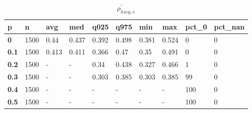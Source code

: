 \begin{table}[h]
 \centering 
\footnotesize
\caption{$\rho_{hscg,s}^\prime $}
\label{tab:alphahscgs}
\begin{tabular}[h]{|l|l|l|l|l|l|l|l|l|l|
    } \hline
\textbf{ p} & \textbf{ n} & \textbf{ avg} & \textbf{ med} & \textbf{ q025} & \textbf{ q975} & \textbf{ min} & \textbf{ max} & \textbf{ pct\_0} & \textbf{ pct\_nan}
    \\ \hline
  \textbf{  0} & 1500 &  0.44 & 0.437 & 0.392 & 0.498 & 0.381 & 0.524 &   0 & 0
    \\ \hline
  \textbf{0.1} & 1500 & 0.413 & 0.411 & 0.366 &  0.47 &  0.35 & 0.491 &   0 & 0
    \\ \hline
  \textbf{0.2} & 1500 & - & - &  0.34 & 0.438 & 0.327 & 0.466 &   1 & 0
    \\ \hline
  \textbf{0.3} & 1500 & - & - & 0.303 & 0.385 & 0.303 & 0.385 &  99 & 0
    \\ \hline
  \textbf{0.4} & 1500 & - & - & - & - & - & - & 100 & 0
    \\ \hline
  \textbf{0.5} & 1500 & - & - & - & - & - & - & 100 & 0
    \\ \hline
 \end{tabular}
 \end{table}
